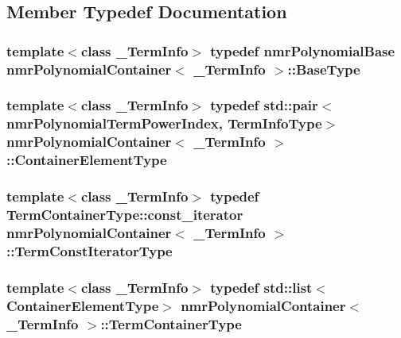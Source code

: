 \subsection{Member Typedef Documentation}
\hypertarget{classnmr_polynomial_container_afcdfc28d7e6ba39198175c7a2cc5ed7d}{
\subsubsection[{Base\-Type}]{\setlength{\rightskip}{0pt plus 5cm}template$<$class \-\_\-\-Term\-Info$>$ typedef {\bf nmr\-Polynomial\-Base} {\bf nmr\-Polynomial\-Container}$<$ \-\_\-\-Term\-Info $>$\-::{\bf Base\-Type}}}\label{classnmr_polynomial_container_afcdfc28d7e6ba39198175c7a2cc5ed7d}
\hypertarget{classnmr_polynomial_container_ae9c399b9034fb32315a644ebb103b4dd}{
\subsubsection[{Container\-Element\-Type}]{\setlength{\rightskip}{0pt plus 5cm}template$<$class \-\_\-\-Term\-Info$>$ typedef std\-::pair$<${\bf nmr\-Polynomial\-Term\-Power\-Index}, {\bf Term\-Info\-Type}$>$ {\bf nmr\-Polynomial\-Container}$<$ \-\_\-\-Term\-Info $>$\-::{\bf Container\-Element\-Type}}}\label{classnmr_polynomial_container_ae9c399b9034fb32315a644ebb103b4dd}
\hypertarget{classnmr_polynomial_container_aba8d31506ab6a487fdc4fe2815469442}{
\subsubsection[{Term\-Const\-Iterator\-Type}]{\setlength{\rightskip}{0pt plus 5cm}template$<$class \-\_\-\-Term\-Info$>$ typedef Term\-Container\-Type\-::const\-\_\-iterator {\bf nmr\-Polynomial\-Container}$<$ \-\_\-\-Term\-Info $>$\-::{\bf Term\-Const\-Iterator\-Type}}}\label{classnmr_polynomial_container_aba8d31506ab6a487fdc4fe2815469442}
\hypertarget{classnmr_polynomial_container_ae9ba96ffe1b50f1cd84e6728c3a77128}{
\subsubsection[{Term\-Container\-Type}]{\setlength{\rightskip}{0pt plus 5cm}template$<$class \-\_\-\-Term\-Info$>$ typedef std\-::list$<${\bf Container\-Element\-Type}$>$ {\bf nmr\-Polynomial\-Container}$<$ \-\_\-\-Term\-Info $>$\-::{\bf Term\-Container\-Type}}}\label{classnmr_polynomial_container_ae9ba96ffe1b50f1cd84e6728c3a77128}
